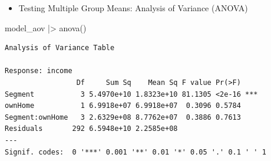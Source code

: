 \documentclass[
  ignorenonframetext,
]{beamer}
\newenvironment{Shaded}{\begin{snugshade}}{\end{snugshade}}
\newcommand{\FunctionTok}[1]{\textcolor[rgb]{0.28,0.35,0.67}{#1}}
\newcommand{\NormalTok}[1]{\textcolor[rgb]{0.00,0.23,0.31}{#1}}
\newcommand{\SpecialCharTok}[1]{\textcolor[rgb]{0.37,0.37,0.37}{#1}}
\providecommand{\tightlist}{%
  \setlength{\itemsep}{0pt}\setlength{\parskip}{0pt}}\usepackage{longtable,booktabs,array}
\begin{document}
\begin{frame}[fragile]{}
\label{section-38}
\begin{itemize}
\tightlist
\item
  Testing Multiple Group Means: Analysis of Variance (ANOVA)
\end{itemize}

\tiny

\begin{Shaded}
\begin{Highlighting}[]
\NormalTok{model\_aov }\SpecialCharTok{|\textgreater{}} 
  \FunctionTok{anova}\NormalTok{()}
\end{Highlighting}
\end{Shaded}

\begin{verbatim}
Analysis of Variance Table

Response: income
                 Df     Sum Sq    Mean Sq F value Pr(>F)    
Segment           3 5.4970e+10 1.8323e+10 81.1305 <2e-16 ***
ownHome           1 6.9918e+07 6.9918e+07  0.3096 0.5784    
Segment:ownHome   3 2.6329e+08 8.7762e+07  0.3886 0.7613    
Residuals       292 6.5948e+10 2.2585e+08                   
---
Signif. codes:  0 '***' 0.001 '**' 0.01 '*' 0.05 '.' 0.1 ' ' 1
\end{verbatim}
\end{frame}
\end{document}
